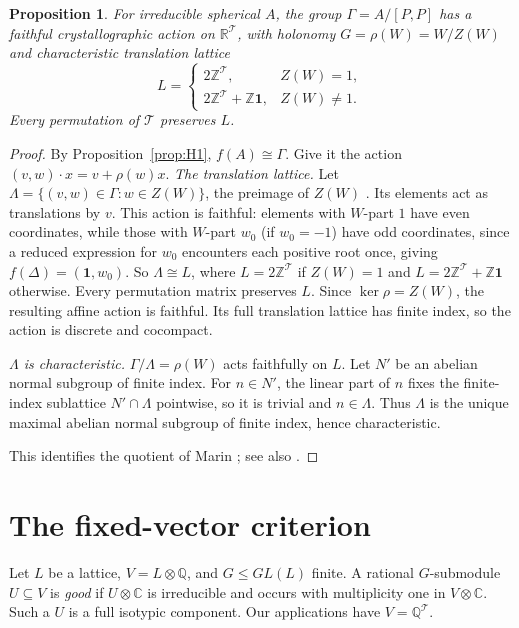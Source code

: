 \documentclass[11pt]{article}
\newtheorem{proposition}[theorem]{Proposition}
\theoremstyle{definition}
\newcommand{\Z}{\mathbb{Z}}
\newcommand{\Q}{\mathbb{Q}}
\newcommand{\C}{\mathbb{C}}
\newcommand{\T}{\mathcal{T}}
\begin{document}
\begin{proposition}\label{prop:translation-lattice}
For irreducible spherical $A$, the group $\Gamma=A/[P,P]$ has a faithful crystallographic action
on $\mathbb R^\T$, with holonomy $G=\rho(W)=W/Z(W)$ and characteristic translation lattice
\[
 L=\begin{cases}2\Z^\T,&Z(W)=1,\\2\Z^\T+\Z\mathbf1,&Z(W)\ne1.\end{cases}
\]
Every permutation of $\T$ preserves $L$.
\end{proposition}
\begin{proof}
By Proposition~\ref{prop:H1}, $f(A)\cong\Gamma$. Give it the action
$(v,w)\cdot x=v+\rho(w)x$.
\emph{The translation lattice.} Let $\Lambda=\{(v,w)\in\Gamma: w\in Z(W)\}$, the preimage of $Z(W)$ \cite[Thm.~2.1]{Mar15}.
Its elements act as translations by $v$. This action is faithful: elements with $W$-part $1$ have even coordinates,
while those with $W$-part $w_0$ (if $w_0=-1$) have odd coordinates, since a reduced expression for $w_0$ encounters each positive root once, giving
$f(\Delta)=(\mathbf1,w_0)$. So
$\Lambda\cong L$, where $L=2\Z^\T$ if $Z(W)=1$ and $L=2\Z^\T+\Z\mathbf 1$ otherwise. Every permutation matrix preserves $L$.
Since $\ker\rho=Z(W)$, the resulting affine action is faithful. Its full translation lattice has finite
index, so the action is discrete and cocompact.

\emph{$\Lambda$ is characteristic.} $\Gamma/\Lambda=\rho(W)$ acts faithfully on $L$. Let $N'$ be an abelian normal subgroup
of finite index. For $n\in N'$, the linear part of $n$ fixes the finite-index sublattice $N'\cap\Lambda$ pointwise, so it
is trivial and $n\in\Lambda$. Thus $\Lambda$ is the unique maximal abelian normal subgroup of finite index, hence
characteristic.

This identifies the quotient of Marin \cite[Thm.~2.1, Cor.~2.2]{Mar15}; see also
\cite{GGO17,DKNS24}.
\end{proof}

\section{The fixed-vector criterion}\label{sec:criterion}

Let $L$ be a lattice, $V=L\otimes\Q$, and $G\le GL(L)$ finite. A rational $G$-submodule
$U\subseteq V$ is \emph{good} if $U\otimes\C$ is irreducible and occurs with multiplicity one in
$V\otimes\C$. Such a $U$ is a full isotypic component. Our applications have $V=\Q^\T$.
\end{document}
